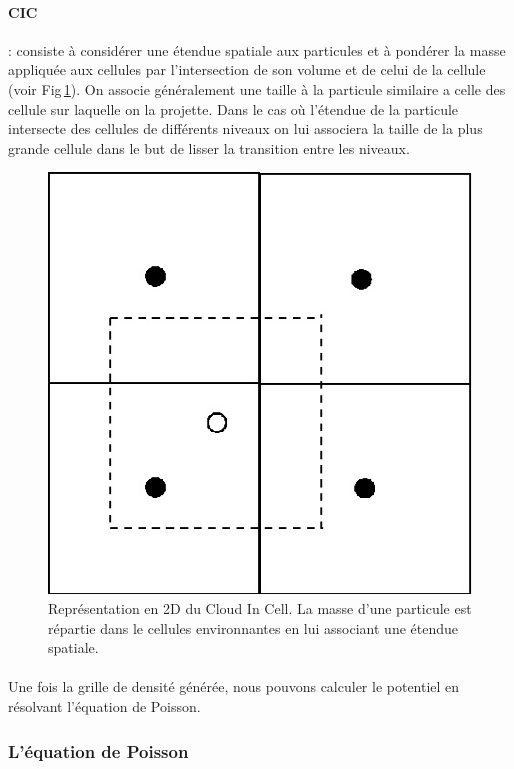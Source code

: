 \paragraph{CIC} : consiste à considérer une étendue spatiale aux particules et à pondérer la masse appliquée aux cellules par l'intersection de son volume et de celui de la cellule (voir Fig\,\ref{fig:CIC}).
On associe généralement une taille à la particule similaire a celle des cellule sur laquelle on la projette.
Dans le cas où l’étendue de la particule intersecte des cellules de différents niveaux on lui associera la taille de la plus grande cellule dans le but de lisser la transition entre les niveaux.

\begin{figure}
		\centering
        \includegraphics[width=.5\linewidth]{img/02/CIC.jpg} 
        \caption[CIC]{Représentation en 2D du Cloud In Cell. 
        La masse d'une particule est répartie dans le cellules environnantes en lui associant une étendue spatiale.
 		\label{fig:CIC}}
\end{figure}

\paragraph{}
Une fois la grille de densité générée, nous pouvons calculer le potentiel en résolvant l'équation de Poisson.

\subsubsection{L'équation de Poisson}

